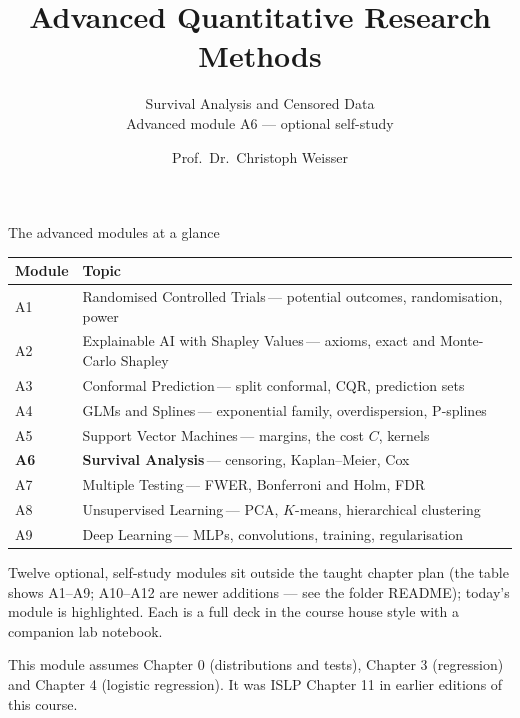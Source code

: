 \documentclass[aspectratio=169,11pt]{beamer}
\title{Advanced Quantitative Research Methods}
\subtitle{Survival Analysis and Censored Data\\[2pt]{\small Advanced module A6 --- optional self-study}}
\author{Prof.\ Dr.\ Christoph Weisser}
\date{}\graphicspath{{images/}}
\begin{document}
\begin{frame}[plain]\titlepage\end{frame}

\begin{frame}{The advanced modules at a glance}
  \vspace{-1.5mm}
  \begin{center}
  \scriptsize
  \setlength{\tabcolsep}{5pt}
  \renewcommand{\arraystretch}{1.30}
  \begin{tabular}{@{\hspace{2pt}}l >{\raggedright\arraybackslash}p{}@{\hspace{2pt}}}
    \toprule
    \textbf{Module} & \textbf{Topic} \\
    \midrule
     {\color{accent}A1} & Randomised Controlled Trials\,{\color{black!45}--- potential outcomes, randomisation, power} \\
    \rowcolor{black!3} {\color{accent}A2} & Explainable AI with Shapley Values\,{\color{black!45}--- axioms, exact and Monte-Carlo Shapley} \\
     {\color{accent}A3} & Conformal Prediction\,{\color{black!45}--- split conformal, CQR, prediction sets} \\
    \rowcolor{black!3} {\color{accent}A4} & GLMs and Splines\,{\color{black!45}--- exponential family, overdispersion, P-splines} \\
     {\color{accent}A5} & Support Vector Machines\,{\color{black!45}--- margins, the cost $C$, kernels} \\
    \rowcolor{accent!18} \textbf{A6} & \textbf{Survival Analysis}\,{\color{accent!75!black}--- censoring, Kaplan--Meier, Cox} \\
     {\color{accent}A7} & Multiple Testing\,{\color{black!45}--- FWER, Bonferroni and Holm, FDR} \\
    \rowcolor{black!3} {\color{accent}A8} & Unsupervised Learning\,{\color{black!45}--- PCA, $K$-means, hierarchical clustering} \\
     {\color{accent}A9} & Deep Learning\,{\color{black!45}--- MLPs, convolutions, training, regularisation} \\
    \bottomrule
  \end{tabular}
  \end{center}
  \vspace{2mm}
  {\scriptsize Twelve optional, self-study modules sit outside the taught
  chapter plan (the table shows A1--A9; A10--A12 are newer additions --- see the folder README); today's module is highlighted. Each is a full deck in the course
  house style with a companion lab notebook.\par\medskip This module assumes Chapter 0 (distributions and tests), Chapter 3 (regression) and Chapter 4 (logistic regression). It was ISLP Chapter 11 in earlier editions of this course.}
\end{frame}
\end{document}
